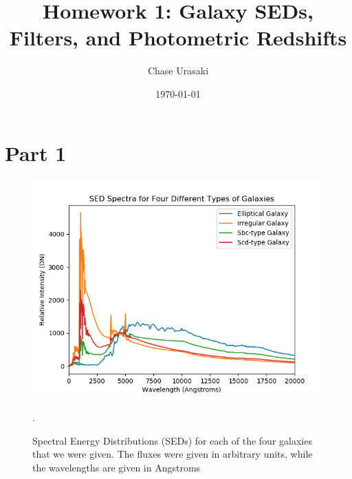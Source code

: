 \documentclass[12pt]{article}
\begin{document}
 

\title{Homework 1: Galaxy SEDs, Filters, and Photometric Redshifts}
\author{Chase Urasaki}

\date{\today}

\maketitle 

\section{Part 1}
\begin{center}
\begin{figure}[H]
\label{SEDs}
\includegraphics[scale=1.0]{SEDs.png}
\caption{Spectral Energy Distributions (SEDs) for each of the four galaxies that we were given. The fluxes were given in arbitrary units, while the wavelengths are given in Angstroms}. 
\end{figure}
\end{center}
\end{document}
